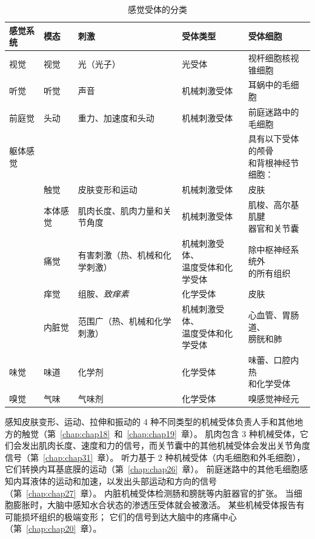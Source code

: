 \begin{table}[htbp]
	\centering
	\caption{感觉受体的分类}
	\begin{tabular}{lllll}
		\toprule
		感觉系统 & 模态 & 刺激 & 受体类型 & 受体细胞 \\
		\midrule
		视觉 & 视觉 & 光（光子）   & 光受体 & 视杆细胞核视锥细胞\\
		听觉 & 听觉 & 声音   & 机械刺激受体 & 耳蜗中的毛细胞 \\
		前庭觉 & 头动 & 重力、加速度和头动   & 机械刺激受体 & 前庭迷路中的毛细胞 \\
		躯体感觉 &  &   &  & \makecell[l]{具有以下受体的颅骨 \\ 和背根神经节细胞：} \\
		 & 触觉 & 皮肤变形和运动   & 机械刺激受体 & 皮肤 \\
		 & 本体感觉 & 肌肉长度、肌肉力量和关节角度   & 机械刺激受体 & \makecell[l]{肌梭、高尔基肌腱 \\ 器官和关节囊}  \\
		 & 痛觉 & 有害刺激（热、机械和化学刺激）  & \makecell[l]{机械刺激受体、 \\ 温度受体和化学受体}  & \makecell[l]{除中枢神经系统外 \\ 的所有组织}  \\
		 & 痒觉 & 组胺、\textit{致痒素}  & 化学受体 & 皮肤 \\
		 & 内脏觉 & 范围广（热、机械和化学刺激）  & \makecell[l]{机械刺激受体、 \\ 温度受体和化学受体} & \makecell[l]{心血管、胃肠道、 \\ 膀胱和肺}  \\
		味觉 & 味道 & 化学剂   & 化学受体 & \makecell[l]{味蕾、口腔内热 \\ 和化学受体}  \\
		嗅觉 & 气味 & 气味剂   & 化学受体 & 嗅感觉神经元 \\
		\bottomrule
	\end{tabular}%
	\label{tab:17_1}%
\end{table}%


感知皮肤变形、运动、拉伸和振动的 4 种不同类型的机械受体负责人手和其他地方的触觉（第~\ref{chap:chap18}~和~\ref{chap:chap19}~章）。
肌肉包含 3 种机械受体，它们会发出肌肉长度、速度和力的信号，而关节囊中的其他机械受体会发出关节角度信号（第~\ref{chap:chap31}~章）。
听力基于 2 种机械受体（内毛细胞和外毛细胞），它们转换内耳基底膜的运动（第~\ref{chap:chap26}~章）。
前庭迷路中的其他毛细胞感知内耳液体的运动和加速，以发出头部运动和方向的信号（第~\ref{chap:chap27}~章）。 
内脏机械受体检测肠和膀胱等内脏器官的扩张。 
当细胞膨胀时，大脑中感知水合状态的渗透压受体就会被激活。 
某些机械受体报告有可能损坏组织的极端变形； 
它们的信号到达大脑中的疼痛中心（第~\ref{chap:chap20}~章）。


